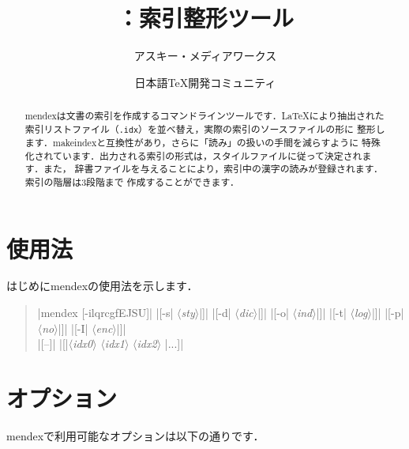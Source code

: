 \documentclass[a4paper]{jsarticle}
\title{\SoftName{mendex}：索引整形ツール}
\author{アスキー・メディアワークス \and 日本語\TeX 開発コミュニティ}
\newenvironment{syntax}{\begin{quote}\small}{\end{quote}}
\newcommand{\SoftName}[1]{\textsf{#1}}
\newcommand{\FileExtension}[1]{\texttt{.#1}}
\newcommand{\Meta}[1]{$\langle$\mbox{}\textit{#1}\mbox{}$\rangle$}
\begin{document}
\maketitle

\begin{abstract}
\SoftName{mendex}は文書の索引を作成するコマンドラインツールです．\LaTeX により抽出された
索引リストファイル（\FileExtension{idx}）を並べ替え，実際の索引のソースファイルの形に
整形します．\SoftName{makeindex}と互換性があり，さらに「読み」の扱いの手間を減らすように
特殊化されています．出力される索引の形式は，スタイルファイルに従って決定されます．また，
辞書ファイルを与えることにより，索引中の漢字の読みが登録されます．索引の階層は3段階まで
作成することができます．
\end{abstract}

\section{使用法}

はじめに\SoftName{mendex}の使用法を示します．
%
\begin{syntax}
|mendex [-ilqrcgfEJSU]|
|[-s| \Meta{sty}|]|
|[-d| \Meta{dic}|]|
|[-o| \Meta{ind}|]|
|[-t| \Meta{log}|]|
|[-p| \Meta{no}|]|
|[-I| \Meta{enc}|]| \\
%
|[--]|
|[|\Meta{idx0} \Meta{idx1} \Meta{idx2} |...]|
\end{syntax}

\section{オプション}

\SoftName{mendex}で利用可能なオプションは以下の通りです．
\end{document}
